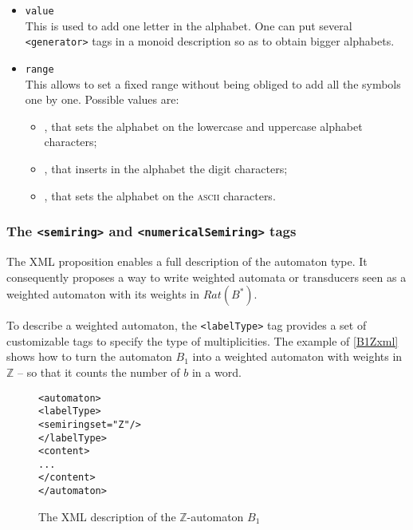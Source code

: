 \documentclass[a4paper]{article}
\newcommand{\xtag}[1]{\texttt{<#1>}}
\newcommand{\xattr}[1]{\texttt{#1}}
\begin{document}
\begin{itemize}
\item \xattr{value}\\
  This is used to add one letter in the alphabet. One can put several
  \xtag{generator} tags in a monoid description so as to obtain bigger
  alphabets.
\item \xattr{range}\\
  This allows to set a fixed range without being obliged to add all
  the symbols one by one. Possible values are:
  \begin{itemize}
  \item {}, that sets the alphabet on the lowercase
    and uppercase alphabet characters;
  \item {}, that inserts in the alphabet the digit characters;
  \item {}, that sets the alphabet on the \textsc{ascii} characters.
  \end{itemize}
\end{itemize}

\subsubsection{The \xtag{semiring} and \xtag{numericalSemiring} tags}

The XML proposition enables a full description of the automaton type.
It consequently proposes a way to write weighted automata or
transducers seen as a weighted automaton with its weights in
$Rat(B^*)$.

To describe a weighted automaton, the \xtag{labelType} tag provides a set of
customizable tags to specify the type of multiplicities. The example
of \autoref{B1Zxml} shows how to turn the automaton $B_1$ into a
weighted automaton with weights in ${\mathbb Z}$ -- so that it counts the
number of $b$ in a word.

\begin{figure}[ht]
  \small
  \begin{center}
\begin{alltt}
<automaton>
  \xtag{labelType}
     <semiring set="Z"/>
  </labelType>
  <content>
  ...
  </content>
</automaton>
\end{alltt}

\caption{The XML description of the $\mathbb{Z}$-automaton $B_1$}
\label{B1Zxml}
  \end{center}
\end{figure}
\end{document}
